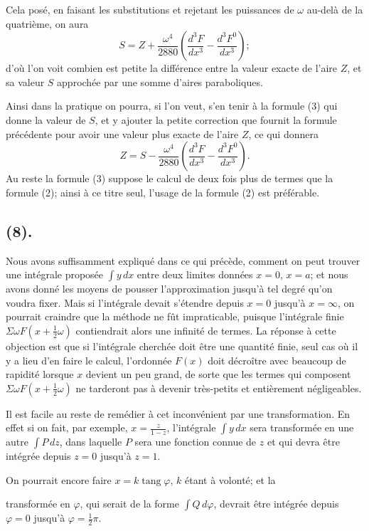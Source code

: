 \documentclass{article}
\begin{document}
Cela posé, en faisant les substitutions et rejetant les puissances de $\omega$ au-delà de la quatrième, on aura
\[ S=Z+\frac{\omega^{4}}{2880}\left(\frac{d^{3}F}{dx^{3}}-\frac{d^{3}F^{0}}{dx^{3}}\right); \]
d'où l'on voit combien est petite la différence entre la valeur exacte de l'aire $Z$, et sa valeur $S$ approchée par une somme d'aires paraboliques.

Ainsi dans la pratique on pourra, si l'on veut, s'en tenir à la formule (3) qui donne la valeur de $S$, et y ajouter la petite correction que fournit la formule précédente pour avoir une valeur plus exacte de l'aire $Z$, ce qui donnera
\[ Z=S-\frac{\omega^{4}}{2880}\left(\frac{d^{3}F}{dx^{3}}-\frac{d^{3}F^{0}}{dx^{3}}\right). \]
Au reste la formule (3) suppose le calcul de deux fois plus de termes que la formule (2); ainsi à ce titre seul, l'usage de la formule (2) est préférable.

\subsection*{(8).}

Nous avons suffisamment expliqué dans ce qui précède, comment on peut trouver une intégrale proposée $\displaystyle\int y\,dx$ entre deux limites données $x=0$, $x=a$; et nous avons donné les moyens de pousser l'approximation jusqu'à tel degré qu'on voudra fixer. Mais si l'intégrale devait s'étendre depuis $x=0$ jusqu'à $x=\infty$, on pourrait craindre que la méthode ne fût impraticable, puisque l'intégrale finie $\Sigma\omega F(x+\frac{1}{2}\omega)$ contiendrait alors une infinité de termes. La réponse à cette objection est que si l'intégrale cherchée doit être une quantité finie, seul cas où il y a lieu d'en faire le calcul, l'ordonnée $F(x)$ doit décroître avec beaucoup de rapidité lorsque $x$ devient un peu grand, de sorte que les termes qui composent $\Sigma\omega F(x+\frac{1}{2}\omega)$ ne tarderont pas à devenir très-petits et entièrement négligeables.

Il est facile au reste de remédier à cet inconvénient par une transformation. En effet si on fait, par exemple, $x=\frac{z}{1-z}$, l'intégrale $\displaystyle\int y\,dx$ sera transformée en une autre $\displaystyle\int P\,dz$, dans laquelle $P$ sera une fonction connue de $z$ et qui devra être intégrée depuis $z=0$ jusqu'à $z=1$.

On pourrait encore faire $x=k\operatorname{tang}\varphi$, $k$ étant à volonté; et la

transformée en $\varphi$, qui serait de la forme $\displaystyle\int Q\,d\varphi$, devrait être intégrée depuis $\varphi=0$ jusqu'à $\varphi=\frac{1}{2}\pi$.
\end{document}

